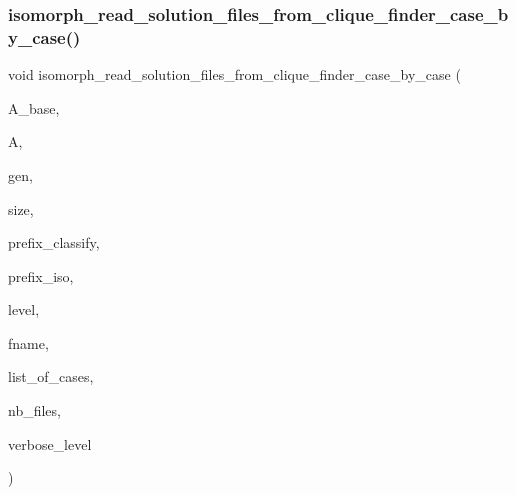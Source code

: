 \subsubsection{\texorpdfstring{isomorph\+\_\+read\+\_\+solution\+\_\+files\+\_\+from\+\_\+clique\+\_\+finder\+\_\+case\+\_\+by\+\_\+case()}{isomorph\_read\_solution\_files\_from\_clique\_finder\_case\_by\_case()}}
{\footnotesize\ttfamily void isomorph\+\_\+read\+\_\+solution\+\_\+files\+\_\+from\+\_\+clique\+\_\+finder\+\_\+case\+\_\+by\+\_\+case (\begin{DoxyParamCaption}\item[{\mbox{\hyperlink{classaction}{action}} $\ast$}]{A\+\_\+base,  }\item[{\mbox{\hyperlink{classaction}{action}} $\ast$}]{A,  }\item[{\mbox{\hyperlink{classgenerator}{generator}} $\ast$}]{gen,  }\item[{\mbox{\hyperlink{galois_8h_a09fddde158a3a20bd2dcadb609de11dc}{I\+NT}}}]{size,  }\item[{const \mbox{\hyperlink{galois_8h_ab6cc7b4aeb6ea31aba2b3fbfc83ff5e6}{B\+Y\+TE}} $\ast$}]{prefix\+\_\+classify,  }\item[{const \mbox{\hyperlink{galois_8h_ab6cc7b4aeb6ea31aba2b3fbfc83ff5e6}{B\+Y\+TE}} $\ast$}]{prefix\+\_\+iso,  }\item[{\mbox{\hyperlink{galois_8h_a09fddde158a3a20bd2dcadb609de11dc}{I\+NT}}}]{level,  }\item[{const \mbox{\hyperlink{galois_8h_ab6cc7b4aeb6ea31aba2b3fbfc83ff5e6}{B\+Y\+TE}} $\ast$$\ast$}]{fname,  }\item[{\mbox{\hyperlink{galois_8h_a09fddde158a3a20bd2dcadb609de11dc}{I\+NT}} $\ast$}]{list\+\_\+of\+\_\+cases,  }\item[{\mbox{\hyperlink{galois_8h_a09fddde158a3a20bd2dcadb609de11dc}{I\+NT}}}]{nb\+\_\+files,  }\item[{\mbox{\hyperlink{galois_8h_a09fddde158a3a20bd2dcadb609de11dc}{I\+NT}}}]{verbose\+\_\+level }\end{DoxyParamCaption})}

\mbox{\label{isomorph__global_8_c_a78a6ee9d7dee4708fc721374bdebfa83}} 
